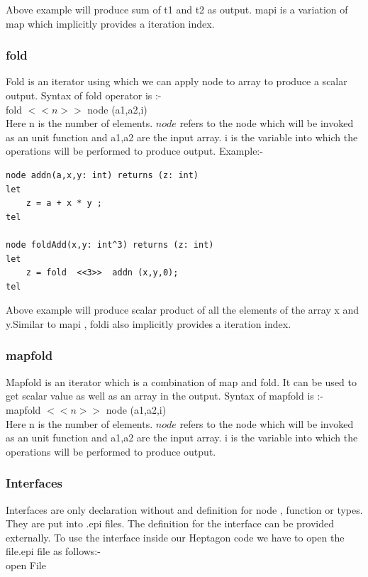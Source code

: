 \documentclass[16pt]{report}
\begin{document}
Above example will produce sum of t1 and t2 as output. mapi is a variation of map which implicitly provides a iteration index.
  


\subsubsection{fold}
Fold is an iterator using which we can apply node to array to produce a scalar output. Syntax of fold operator is :-\\
fold $<<n>>$ node (a1,a2,i)\\
Here n is the number of elements. $node$ refers to the node which will be invoked as an unit function and a1,a2 are the input array. i is the variable into which the operations will be performed to produce output.
Example:-

\begin{verbatim}
node addn(a,x,y: int) returns (z: int)
let
    z = a + x * y ;
tel

node foldAdd(x,y: int^3) returns (z: int)
let
    z = fold  <<3>>  addn (x,y,0);
tel
\end{verbatim}
Above example will produce scalar product of all the elements of the array x and y.Similar to mapi , foldi also implicitly provides a iteration index.



\subsubsection{mapfold}
Mapfold is an iterator which is a combination of map and fold. It can be used to get scalar value as well as an array in the output. Syntax of mapfold is :-\\
mapfold $<<n>>$ node (a1,a2,i)\\
Here n is the number of elements. $node$ refers to the node which will be invoked as an unit function and a1,a2 are the input array. i is the variable into which the operations will be performed to produce output.


\subsubsection{Interfaces}
Interfaces are only declaration without and definition for node , function or types. They are put into .epi files. The definition for the interface can be provided externally. To use the interface inside our Heptagon code we have to open the file.epi file as follows:-\\
open File
\end{document}
